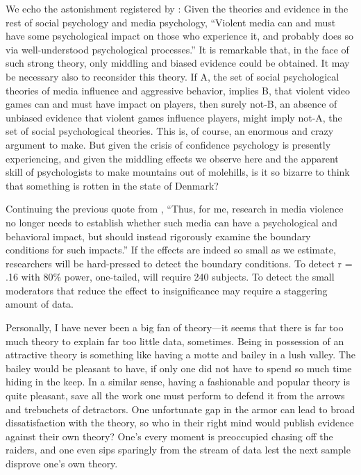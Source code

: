 \documentclass[man]{apa6}
\begin{document}
We echo the astonishment registered by \citet[p. 62]{Warburton:2014}: Given the theories and evidence in the rest of social psychology and media psychology, ``Violent media can and must have some psychological impact on those who experience it, and probably does so via well-understood psychological processes.'' It is remarkable that, in the face of such strong theory, only middling and biased evidence could be obtained. It may be necessary also to reconsider this theory. If A, the set of social psychological theories of media influence and aggressive behavior, implies B, that violent video games can and must have impact on players, then surely not-B, an absence of unbiased evidence that violent games influence players, might imply not-A, the set of social psychological theories. This is, of course, an enormous and crazy argument to make. But given the crisis of confidence psychology is presently experiencing, and given the middling effects we observe here and the apparent skill of psychologists to make mountains out of molehills, is it so bizarre to think that something is rotten in the state of Denmark?

Continuing the previous quote from \citet[p. 62]{Warburton:2014}, %
``Thus, for me, research in media violence no longer needs to establish whether such media can have a psychological and behavioral impact, but should instead rigorously examine the boundary conditions for such impacts.'' If the effects are indeed so small as we estimate, researchers will be hard-pressed to detect the boundary conditions. To detect r = .16 with 80\% power, one-tailed, will require 240 subjects. To detect the small moderators that reduce the effect to insignificance may require a staggering amount of data.

Personally, I have never been a big fan of theory---it seems that there is far too much theory to explain far too little data, sometimes. Being in possession of an attractive theory is something like having a motte and bailey in a lush valley. The bailey would be pleasant to have, if only one did not have to spend so much time hiding in the keep. In a similar sense, having a fashionable and popular theory is quite pleasant, save all the work one must perform to defend it from the arrows and trebuchets of detractors. One unfortunate gap in the armor can lead to broad dissatisfaction with the theory, so who in their right mind would publish evidence against their own theory? One's every moment is preoccupied chasing off the raiders, and one even sips sparingly from the stream of data lest the next sample disprove one's own theory. %
\end{document}

